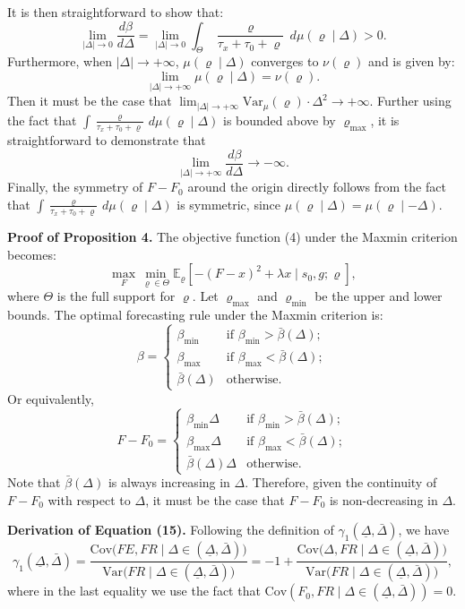 \documentclass[12pt,a4paper]{article}
\newenvironment{original}
  {\par\medskip\noindent\ignorespaces}
  {\par\medskip}
\begin{document}
\begin{original}
It is then straightforward to show that:
\[
\lim_{|\Delta| \to 0} \frac{d\beta}{d\Delta} = \lim_{|\Delta| \to 0} \int_{\Theta} \frac{\varrho}{\tau_x + \tau_0 + \varrho} \, d\mu(\varrho \mid \Delta) > 0.
\]
Furthermore, when $|\Delta| \to +\infty$, $\mu(\varrho \mid \Delta)$ converges to $\nu(\varrho)$ and is given by:
\[
\lim_{|\Delta| \to +\infty} \mu(\varrho \mid \Delta) = \nu(\varrho).
\]
Then it must be the case that $\lim_{|\Delta| \to +\infty} \text{Var}_{\mu}(\varrho) \cdot \Delta^2 \to +\infty$. Further using the fact that $\int \frac{\varrho}{\tau_x + \tau_0 + \varrho} \, d\mu(\varrho \mid \Delta)$ is bounded above by $\varrho_{\max}$, it is straightforward to demonstrate that
\[
\lim_{|\Delta| \to +\infty} \frac{d\beta}{d\Delta} \to -\infty.
\]
Finally, the symmetry of $F - F_0$ around the origin directly follows from the fact that $\int \frac{\varrho}{\tau_x + \tau_0 + \varrho} \, d\mu(\varrho \mid \Delta)$ is symmetric, since $\mu(\varrho \mid \Delta) = \mu(\varrho \mid -\Delta)$.

\textbf{Proof of Proposition 4.} The objective function (4) under the Maxmin criterion becomes:
\[
\max_F \min_{\varrho \in \Theta} \mathbb{E}_{\varrho}[-(F-x)^2 + \lambda x \mid s_0, g; \varrho],
\]
where $\Theta$ is the full support for $\varrho$. Let $\varrho_{\max}$ and $\varrho_{\min}$ be the upper and lower bounds. The optimal forecasting rule under the Maxmin criterion is:
\[
\beta = \begin{cases}
\beta_{\min} & \text{if } \beta_{\min} > \bar{\beta}(\Delta); \\
\beta_{\max} & \text{if } \beta_{\max} < \bar{\beta}(\Delta); \\
\bar{\beta}(\Delta) & \text{otherwise}.
\end{cases}
\]
Or equivalently,
\[
F - F_0 = \begin{cases}
\beta_{\min} \Delta & \text{if } \beta_{\min} > \bar{\beta}(\Delta); \\
\beta_{\max} \Delta & \text{if } \beta_{\max} < \bar{\beta}(\Delta); \\
\bar{\beta}(\Delta) \Delta & \text{otherwise}.
\end{cases}
\]
Note that $\bar{\beta}(\Delta)$ is always increasing in $\Delta$. Therefore, given the continuity of $F - F_0$ with respect to $\Delta$, it must be the case that $F - F_0$ is non-decreasing in $\Delta$.

\textbf{Derivation of Equation (15).} Following the definition of $\gamma_1(\underline{\Delta}, \bar{\Delta})$, we have
\[
\gamma_1(\underline{\Delta}, \bar{\Delta}) = \frac{\text{Cov}\big(FE, FR \mid \Delta \in (\underline{\Delta}, \bar{\Delta})\big)}{\text{Var}\big(FR \mid \Delta \in (\underline{\Delta}, \bar{\Delta})\big)} = -1 + \frac{\text{Cov}\big(\Delta, FR \mid \Delta \in (\underline{\Delta}, \bar{\Delta})\big)}{\text{Var}\big(FR \mid \Delta \in (\underline{\Delta}, \bar{\Delta})\big)},
\]
where in the last equality we use the fact that $\text{Cov}(F_0, FR \mid \Delta \in (\underline{\Delta}, \bar{\Delta})) = 0$.


\end{original}
\end{document}
